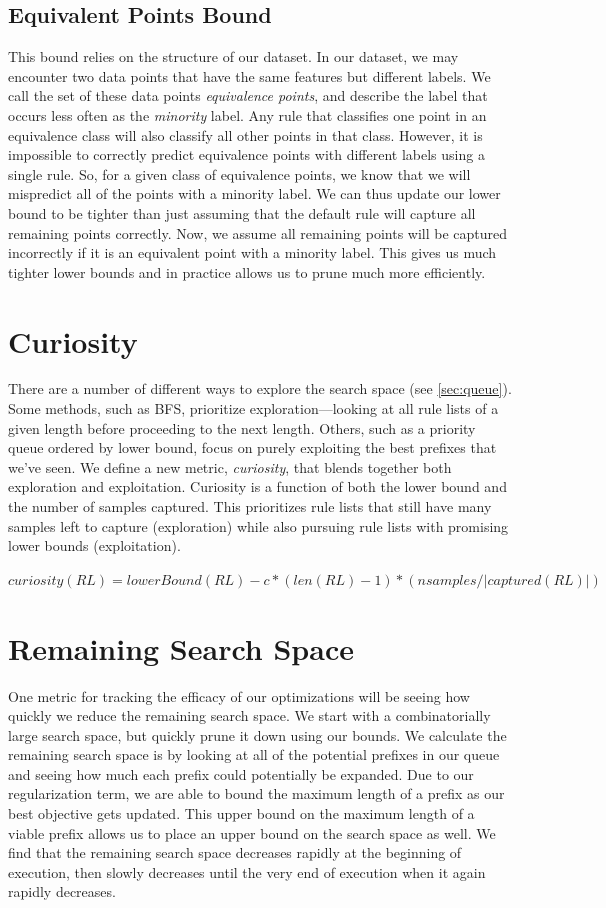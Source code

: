 \documentclass[]{report}
\theoremstyle{definition}
\begin{document}
\subsection{Equivalent Points Bound}
This bound relies on the structure of our dataset.
In our dataset, we may encounter two data points that have the same features but different labels.
We call the set of these data points \textit{equivalence points}, and describe the label that occurs less often as the \textit{minority} label.
Any rule that classifies one point in an equivalence class will also classify all other points in that class.
However, it is impossible to correctly predict equivalence points with different labels using a single rule.
So, for a given class of equivalence points, we know that we will mispredict all of the points with a minority label.
We can thus update our lower bound to be tighter than just assuming that the default rule will capture all remaining points correctly.
Now, we assume all remaining points will be captured incorrectly if it is an equivalent point with a minority label.
This gives us much tighter lower bounds and in practice allows us to prune much more efficiently.

\section{Curiosity}
There are a number of different ways to explore the search space (see \ref{sec:queue}).
Some methods, such as BFS, prioritize exploration---looking at all rule lists of a given length before proceeding to the next length.
Others, such as a priority queue ordered by lower bound, focus on purely exploiting the best prefixes that we've seen.
We define a new metric, \textit{curiosity}, that blends together both exploration and exploitation.
Curiosity is a function of both the lower bound and the number of samples captured.
This prioritizes rule lists that still have many samples left to capture (exploration) while also pursuing rule lists with promising lower bounds (exploitation).

\begin{math}
curiosity(RL) = lowerBound(RL) - c * (len(RL) - 1)  * (nsamples / |captured(RL)|)
\end{math}

\section{Remaining Search Space}
One metric for tracking the efficacy of our optimizations will be seeing how quickly we reduce the remaining search space.
We start with a combinatorially large search space, but quickly prune it down using our bounds.
We calculate the remaining search space is by looking at all of the potential prefixes in our  queue and seeing how much each prefix could potentially be expanded.
Due to our regularization term, we are able to bound the maximum length of a prefix as our best objective gets updated.
This upper bound on the maximum length of a viable prefix allows us to place an upper bound on the search space as well.
We find that the remaining search space decreases rapidly at the beginning of execution, then slowly decreases until the very end of execution when it again rapidly decreases.
\end{document}
